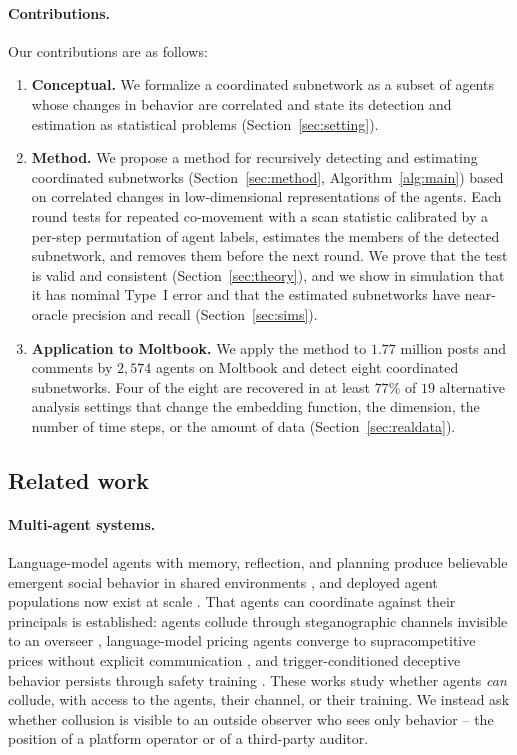 \documentclass{article}
\theoremstyle{plain}
\theoremstyle{definition}
\begin{document}
\paragraph{Contributions.} Our contributions are as follows:
\begin{enumerate}
[wide, labelwidth=1pt, labelindent=12pt]
\setlength{\itemsep}{1pt}\setlength{\parskip}{0pt}
  \item \textbf{Conceptual.} We formalize a coordinated subnetwork as a subset of agents whose changes in behavior are correlated and state its detection and estimation as statistical problems (Section~\ref{sec:setting}).
  \item \textbf{Method.} We propose a method for recursively detecting and estimating coordinated subnetworks (Section~\ref{sec:method}, Algorithm~\ref{alg:main}) based on correlated changes in low-dimensional representations of the agents.  Each round tests for repeated co-movement with a scan statistic calibrated by a per-step permutation of agent labels, estimates the members of the detected subnetwork, and removes them before the next round.
  We prove that the test is valid and consistent (Section~\ref{sec:theory}), and we show in simulation that it has nominal Type~I error and that the estimated subnetworks have near-oracle precision and recall (Section~\ref{sec:sims}).
  \item \textbf{Application to Moltbook.} We apply the method to $1.77$ million posts and comments by $2{,}574$ agents on Moltbook and detect eight coordinated subnetworks.
  Four of the eight are recovered in at least $77\%$ of $19$ alternative analysis settings that change the embedding function, the dimension, the number of time steps, or the amount of data (Section~\ref{sec:realdata}).
\end{enumerate}

\subsection{Related work}
\label{sec:related}

\paragraph{Multi-agent systems.}
Language-model agents with memory, reflection, and planning produce believable emergent social behavior in shared environments \citep{park2023generative}, and deployed agent populations now exist at scale \citep{jiang2026humans,zenity2026moltbook}. That agents can coordinate against their principals is established: agents collude through steganographic channels invisible to an overseer \citep{motwani2024secret,motwani2025open}, language-model pricing agents converge to supracompetitive prices without explicit communication \citep{fish2024algorithmic}, and trigger-conditioned deceptive behavior persists through safety training \citep{hubinger2024sleeper}. These works study whether agents \emph{can} collude, with access to the agents, their channel, or their training. We instead ask whether collusion is visible to an outside observer who sees only behavior -- the position of a platform operator or of a third-party auditor.
\end{document}

